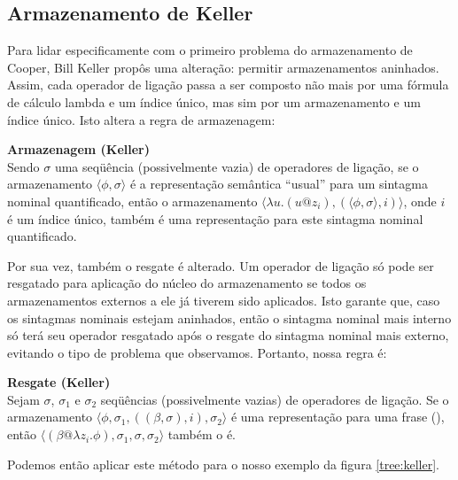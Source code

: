 \subsection{Armazenamento de Keller}
Para lidar especificamente com o primeiro problema do armazenamento de Cooper, Bill Keller propôs uma alteração: permitir armazenamentos aninhados. Assim, cada operador de ligação passa a ser composto não mais por uma fórmula de cálculo lambda e um índice único, mas sim por um armazenamento e um índice único. Isto altera a regra de armazenagem:

\begin{oframed}\textbf{Armazenagem (Keller)}\\
Sendo $\sigma$ uma seqüência (possivelmente vazia) de operadores de ligação, se o armazenamento $\langle\phi, \sigma\rangle$ é a representação semântica ``usual'' para um sintagma nominal quantificado, então o armazenamento $\langle\lambda u.(u@z_i), (\langle \phi, \sigma \rangle, i) \rangle $, onde $i$ é um índice único, também é uma representação para este sintagma nominal quantificado.
\end{oframed}

Por sua vez, também o resgate é alterado. Um operador de ligação só pode ser resgatado para aplicação do núcleo do armazenamento se todos os armazenamentos externos a ele já tiverem sido aplicados. Isto garante que, caso os sintagmas nominais estejam aninhados, então o sintagma nominal mais interno só terá seu operador resgatado após o resgate do sintagma nominal mais externo, evitando o tipo de problema que observamos. Portanto, nossa regra é:

\begin{oframed}\textbf{Resgate (Keller)}\\
Sejam $\sigma$, $\sigma_1$ e $\sigma_2$ seqüências (possivelmente vazias) de operadores de ligação. Se o armazenamento $\langle \phi, \sigma_1, ((\beta, \sigma), i), \sigma_2 \rangle$ é uma representação para uma frase (), então $\langle (\beta @ \lambda z_i . \phi ), \sigma_1, \sigma, \sigma_2 \rangle$ também o é.
\end{oframed}

Podemos então aplicar este método para o nosso exemplo da figura \ref{tree:keller}.

